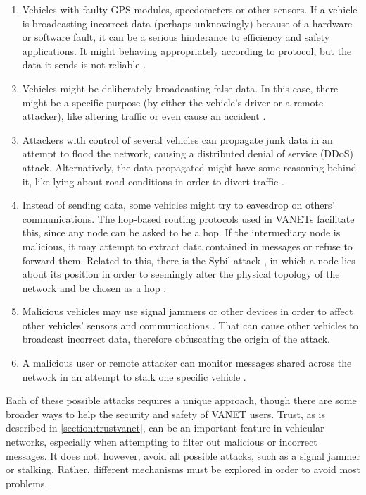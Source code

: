 \begin{enumerate}
	\item 	Vehicles with faulty GPS modules, speedometers or other sensors.
			If a vehicle is broadcasting incorrect data (perhaps unknowingly) because of a hardware or software fault, it can be a serious hinderance to efficiency and safety applications.
			It might behaving appropriately according to protocol, but the data it sends is not reliable \citep{isaac2010security}.
	\item	Vehicles might be deliberately broadcasting false data.
			In this case, there might be a specific purpose (by either the vehicle's driver or a remote attacker), like altering traffic or even cause an accident \citep{golle2004detecting}.
	\item   Attackers with control of several vehicles can propagate junk data in an attempt to flood the network, causing a distributed denial of service (DDoS) attack.
			Alternatively, the data propagated might have some reasoning behind it, like lying about road conditions in order to divert traffic \citep{garip2015congestion}.
	\item	Instead of sending data, some vehicles might try to eavesdrop on others' communications.
			The hop-based routing protocols used in VANETs facilitate this, since any node can be asked to be a hop.
			If the intermediary node is malicious, it may attempt to extract data contained in messages or refuse to forward them.
			Related to this, there is the Sybil attack \citep{isaac2010security}, in which a node lies about its position in order to seemingly alter the physical topology of the network and be chosen as a hop \citep{leinmuller2005influence}.
	\item	Malicious vehicles may use signal jammers or other devices in order to affect other vehicles' sensors and communications \citep{isaac2010security}.
			That can cause other vehicles to broadcast incorrect data, therefore obfuscating the origin of the attack.
	\item	A malicious user or remote attacker can monitor messages shared across the network in an attempt to stalk one specific vehicle \citep{isaac2010security}.
	
\end{enumerate}

Each of these possible attacks requires a unique approach, though there are some broader ways to help the security and safety of VANET users.
Trust, as is described in \autoref{section:trustvanet}, can be an important feature in vehicular networks, especially when attempting to filter out malicious or incorrect messages.
It does not, however, avoid all possible attacks, such as a signal jammer or stalking.
Rather, different mechanisms must be explored in order to avoid most problems.

